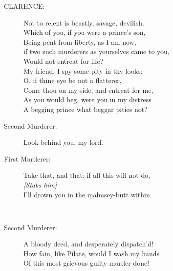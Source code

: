 \documentclass{article}
\begin{document}
\begin{description}
\item[CLARENCE:] 
\hspace{1pt}Not to relent is beastly, savage, devilish.\\
\hspace{1pt}Which of you, if you were a prince's son,\\
\hspace{1pt}Being pent from liberty, as I am now,\\
\hspace{1pt}if two such murderers as yourselves came to you,\\
\hspace{1pt}Would not entreat for life?\\
\hspace{1pt}My friend, I spy some pity in thy looks:\\
\hspace{1pt}O, if thine eye be not a flatterer,\\
\hspace{1pt}Come thou on my side, and entreat for me,\\
\hspace{1pt}As you would beg, were you in my distress\\
\hspace{1pt}A begging prince what beggar pities not?\\
\end{description}
\begin{description}
\item[Second Murderer:] 
\hspace{1pt}Look behind you, my lord.\\
\end{description}
\begin{description}
\item[First Murderer:] 
\hspace{1pt}Take that, and that: if all this will not do,\\
{\it [Stabs him]}\\
\hspace{1pt}I'll drown you in the malmsey-butt within.\\
\end{description}
\\
\begin{description}
\item[Second Murderer:] 
\hspace{1pt}A bloody deed, and desperately dispatch'd!\\
\hspace{1pt}How fain, like Pilate, would I wash my hands\\
\hspace{1pt}Of this most grievous guilty murder done!\\
\end{description}
\end{document}
